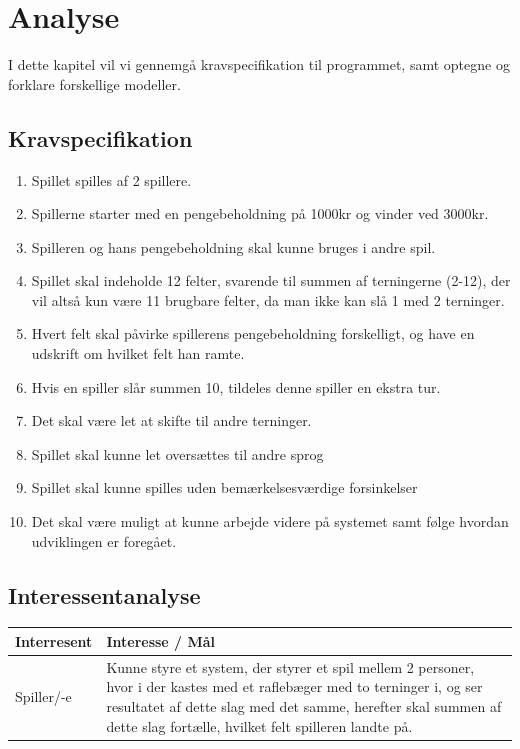 \chapter{Analyse}

I dette kapitel vil vi gennemgå kravspecifikation til programmet, samt optegne og forklare forskellige modeller.


\section{Kravspecifikation}

\begin{enumerate}
    \item Spillet spilles af 2 spillere.
    \item Spillerne starter med en pengebeholdning på 1000kr og vinder ved 3000kr.
    \item Spilleren og hans pengebeholdning skal kunne bruges i andre spil.
    \item Spillet skal indeholde 12 felter, svarende til summen af terningerne (2-12), der vil altså kun være 11 brugbare felter, da man ikke kan slå 1 med 2 terninger.
    \item Hvert felt skal påvirke spillerens pengebeholdning forskelligt, og have en udskrift om hvilket felt han ramte.
    \item Hvis en spiller slår summen 10, tildeles denne spiller en ekstra tur.
    \item Det skal være let at skifte til andre terninger.
    \item Spillet skal kunne let oversættes til andre sprog
    \item Spillet skal kunne spilles uden bemærkelsesværdige forsinkelser
    \item Det skal være muligt at kunne arbejde videre på systemet samt følge hvordan udviklingen er foregået.
    \\
\end{enumerate}

\pagebreak



\section{Interessentanalyse}

\begin{center}
    \begin{tabular}{ | l | p{13cm} |}
    \hline
    \textbf{Interresent} & \textbf{Interesse / Mål} \\ \hline
    Spiller/-e & Kunne styre et system, der styrer et spil mellem 2 personer, 
    hvor i der kastes med et raflebæger med to terninger i, og ser resultatet af dette slag med det samme, herefter skal summen af dette slag fortælle, hvilket felt spilleren landte på.\\ \hline
    \hline
    \end{tabular}
\end{center}

